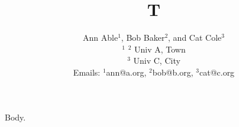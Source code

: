 \documentclass{article}
\begin{document}
\title{T}
\author{\small Ann Able$^1$, Bob Baker$^2$, and Cat Cole$^3$\\
$^1$ $^2$ Univ A, Town\\
$^3$ Univ C, City\\
Emails: $^1$ann@a.org, $^2$bob@b.org, $^3$cat@c.org}
\maketitle
Body.
\end{document}
